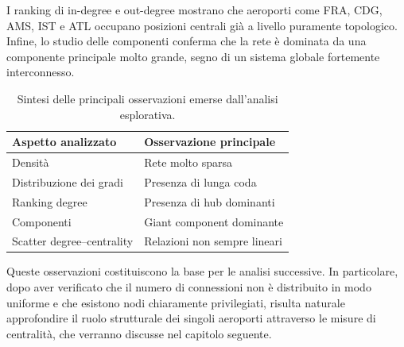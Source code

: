 I ranking di in-degree e out-degree mostrano che aeroporti come FRA, CDG, AMS, IST e ATL occupano posizioni centrali già a livello puramente topologico. Infine, lo studio delle componenti conferma che la rete è dominata da una componente principale molto grande, segno di un sistema globale fortemente interconnesso.

\begin{table}[H]
\centering
\caption{Sintesi delle principali osservazioni emerse dall’analisi esplorativa.}
\label{tab:exploratory_findings}
\begin{tabular}{ll}
\toprule
\textbf{Aspetto analizzato} & \textbf{Osservazione principale} \\
\midrule
Densità & Rete molto sparsa \\
Distribuzione dei gradi & Presenza di lunga coda \\
Ranking degree & Presenza di hub dominanti \\
Componenti & Giant component dominante \\
Scatter degree--centrality & Relazioni non sempre lineari \\
\bottomrule
\end{tabular}
\end{table}

Queste osservazioni costituiscono la base per le analisi successive. In particolare, dopo aver verificato che il numero di connessioni non è distribuito in modo uniforme e che esistono nodi chiaramente privilegiati, risulta naturale approfondire il ruolo strutturale dei singoli aeroporti attraverso le misure di centralità, che verranno discusse nel capitolo seguente.
